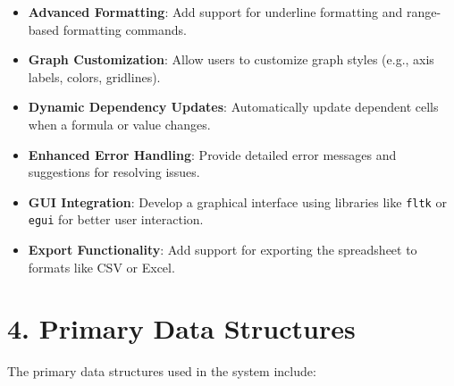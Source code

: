 \documentclass{article}
\begin{document}
\begin{itemize}
    \item \textbf{Advanced Formatting}:
    Add support for underline formatting and range-based formatting commands.
    \item \textbf{Graph Customization}:
    Allow users to customize graph styles (e.g., axis labels, colors, gridlines).
    \item \textbf{Dynamic Dependency Updates}:
    Automatically update dependent cells when a formula or value changes.
    \item \textbf{Enhanced Error Handling}:
    Provide detailed error messages and suggestions for resolving issues.
    \item \textbf{GUI Integration}:
    Develop a graphical interface using libraries like \texttt{fltk} or \texttt{egui} for better user interaction.
    \item \textbf{Export Functionality}:
    Add support for exporting the spreadsheet to formats like CSV or Excel.
\end{itemize}

\section*{4. Primary Data Structures}

The primary data structures used in the system include:
\end{document}
